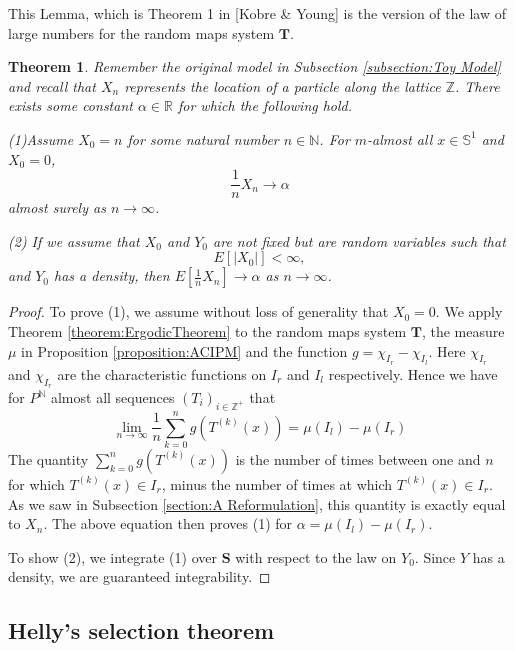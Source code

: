 \documentclass[pdftex,11pt,a4paper,oneside]{article}
\theoremstyle{plain}
\newtheorem{theorem}{Theorem}[section]
\begin{document}
This Lemma, which is Theorem 1 in [Kobre \& Young] is the version of the law of large numbers for the random maps system $\mathbf{T}$.
\begin{theorem}\label{MainTheorem}
Remember the original model in Subsection \ref{subsection:Toy Model} and recall that $X_n$ represents the location of a particle along the lattice $\mathbb{Z}$. There exists some constant $\alpha\in \mathbb{R}$ for which the following hold.


(1)Assume $X_0 = n$ for some natural number $n\in\mathbb{N}$. For $m$-almost all $x \in\mathbb{S}^1$ and $X_0=0$,
\[\frac{1}{n}X_n \to \alpha\]
almost surely as $n\to\infty$.


(2) If we assume that $X_0$ and $Y_0$ are not fixed but are random variables such that 
\[E[|X_0|] <\infty,\]
and $Y_0$ has a density, then $E[\frac{1}{n}X_n]\to \alpha$
as $n\to\infty$.
\end{theorem}
\begin{proof}
To prove (1), we assume without loss of generality that $X_0 = 0$. We apply Theorem \ref{theorem:ErgodicTheorem} to the random maps system $\mathbf{T}$, the measure $\mu$ in Proposition \ref{proposition:ACIPM} and the function $g = \chi_{I_r}-\chi_{I_l}$. Here $\chi_{I_r}$ and $\chi_{I_r}$ are the characteristic functions on $I_r$ and $I_l$ respectively. Hence we have for $P^\mathbb{N}$ almost all sequences $(T_i)_{i\in\mathbb{Z}^+}$ that 
\[\lim_{n\to\infty} \frac{1}{n}\sum_{k=0}^n g( T^{(k)}(x)) = \mu(I_l)-\mu(I_r)\]
The quantity $\sum_{k=0}^n g( T^{(k)}(x))$ is the number of times between one and $n$ for which $T^{(k)}(x)\in I_r$, minus the number of times at which $T^{(k)}(x)\in I_r$. As we saw in Subsection \ref{section:A Reformulation}, this quantity is exactly equal to $X_n$. The above equation then proves (1) for $\alpha = \mu(I_l)-\mu(I_r)$.

To show (2), we integrate (1) over $\mathbf{S}$ with respect to the law on $Y_0$. Since $Y$ has a density, we are guaranteed integrability. 
\end{proof}

\subsection{Helly's selection theorem}
\end{document}
